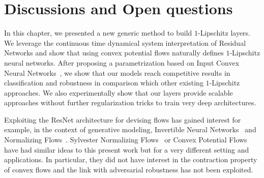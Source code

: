 \section{Discussions and Open questions}
In this chapter, we presented a new generic method to build $1$-Lipschitz layers.
We leverage the continuous time dynamical system interpretation of Residual Networks and show that using convex potential flows naturally defines $1$-Lipschitz neural networks.
After proposing a parametrization based on Input Convex Neural Networks~\citep{amos2017input}, we  show that our models  reach competitive results in classification and robustness in comparison which other existing $1$-Lipschitz approaches.
We also experimentally show that our layers provide scalable approaches without further regularization tricks to train very deep architectures.

Exploiting the ResNet architecture for devising flows has gained interest for example, in the context of generative modeling, Invertible Neural Networks~\citep{behrmann2019invertible} and Normalizing Flows~\citep{rezende2015variational, verine2021expressivity}.
Sylvester Normalizing Flows~\citep{vdberg2018sylvester} or Convex Potential Flows~\citep{huang2021convex} have had similar ideas to this present work but for a very different setting and applications. In particular, they did not have interest in the contraction property of convex flows and the link with adversarial robustness has not been exploited.



